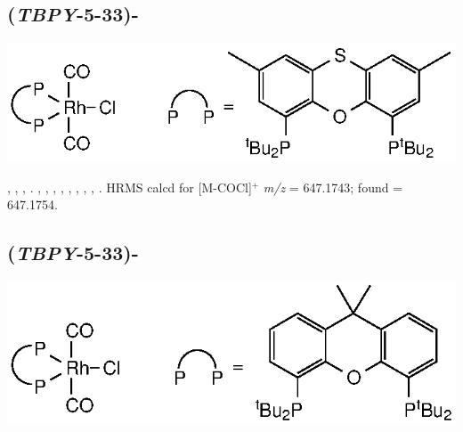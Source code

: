 
\subsection*{(\emph{TBPY}-5-33)-}

\begin{structure}[h]
\begin{center}
\includegraphics{../Structures/RhCl(StBu)(CO)2.eps}
\end{center}
\end{structure}

,
,
,
.
,
,
,
,
,
,
,
,
.
HRMS calcd for  [M-COCl]$^+$ \emph{m/z} = 647.1743; found = 647.1754.



\subsection*{(\emph{TBPY}-5-33)-}

\begin{structure}[h]
\begin{center}
\includegraphics{../Structures/RhCl(CtBu)(CO)2.eps}
\end{center}
\end{structure}


